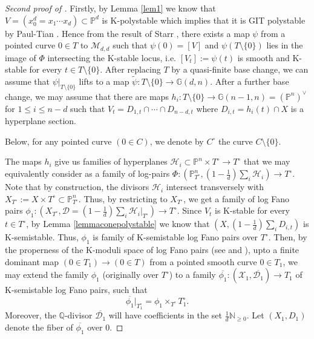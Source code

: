\documentclass[11pt,reqno]{amsart}
\newcommand{\Q}{\mathbb{Q}}
\newcommand{\N}{\mathbb{N}}
\renewcommand{\P}{\mathbb{P}}
\newcommand{\cD}{\mathcal{D}}
\newcommand{\cH}{\mathcal{H}}
\newcommand{\cM}{\mathcal{M}}
\newcommand{\cX}{\mathcal{X}}
\newcommand{\bP}{\mathbb{P}}
\newcommand{\bG}{\mathbb{G}}
\newcommand{\tpsi}{\tilde{\psi}}
\numberwithin{equation}{section}
\theoremstyle{definition}
\begin{document}
\begin{proof}[Second proof of ]
Firstly, by Lemma \ref{lem1} we know that $V= (x_0^d = x_1\cdots x_d)\subset \bP^d$ is K-polystable which implies that it is GIT polystable by Paul-Tian \cite{PT06}. 
Hence from the result of Starr \cite{Sta06}, there exists a map $\psi$ from a pointed curve $0\in T$ to $\cM_{d,d}$ such that $\psi(0)= [V]$ and $\psi(T\setminus \{0\})$ lies in the image of $\Phi$ intersecting the K-stable locus, i.e.  $[V_t]:=\psi(t)$ is smooth and K-stable for every $t\in T\setminus \{0\}$. After replacing $T$ by a quasi-finite base change, we can assume that $\psi|_{T\setminus \{0\}}$ lifts to a map $\tpsi:T\setminus \{0\}\to \bG(d,n)$. After a further base change, we may assume that there are maps $h_i: T\setminus \{0\} \to \bG(n-1, n)=(\bP^n)^\vee$ for $1\leq i\leq n-d$ such that $V_t = D_{1,t} \cap \cdots \cap D_{n-d,t}$ where $D_{i,t} = h_i(t)\cap X$ is a hyperplane section.

Below, for any pointed curve $( 0 \in C)$, we denote by $C^\circ$ the curve $C \setminus \{0\}$.


The maps $h_i$ give us families of hyperplanes $\cH_i \subset  \P^n \times T^{\circ} \to T^{\circ}$ that we may equivalently consider as a family of log-pairs  $\Phi: (\P^n _{T^\circ}, (1 - \frac{1}{d}) \sum _i \cH_i)\to T^{\circ} $. Note that by construction, the divisors $\cH_i$ intersect transversely with $X_{T^\circ} := X \times T^{\circ} \subset \P^n _{T^\circ}$. Thus, by restricting to $X_{T^\circ}$, we get a family of log Fano pairs $\phi_1: (X_{T^\circ}, \cD = (1 - \frac{1}{d}) \sum _i \cH_i |_{T^\circ} )\to T^{\circ} $. Since $V_t$ is K-stable for every $t\in T^{\circ}$, by Lemma \ref{lemmaconepolystable} we know that $(X, (1-\frac{1}{d})\sum_{i} D_{i,t})$ is K-semistable. Thus, $\phi_1$ is family of K-semistable log Fano pairs over $T^{\circ}$. Then, by the properness of the K-moduli space of  log Fano pairs (see \cite[Corollary~7.4]{BlumHalpernLeistnerLiXuProperness} and \cite{LiuXuZhuangHigherrankfinitegeneration}), upto a finite dominant map $(0 \in T_1) \to (0 \in T)$ from a pointed smooth curve $0 \in T_1$, we may extend the family $\phi_1$ (originally over $T^\circ$) to a family $\overline{\phi_1}: (\cX_1, \overline{\cD_1}) \to T_1$ of K-semistable log Fano pairs, such that
\[ \overline {\phi_1} |_{T_1 ^{\circ}} = \phi_1 \times _{T^\circ} T^\circ _1. \]
 Moreover, the $\Q$-divisor $\overline{\cD_1}$ will have coefficients in the set $\frac{1}{d} \N_{\geq 0}$. Let $(X_1, D_1)$ denote the fiber of $\overline{\phi_1}$ over $0$.


\end{proof}
\end{document}
